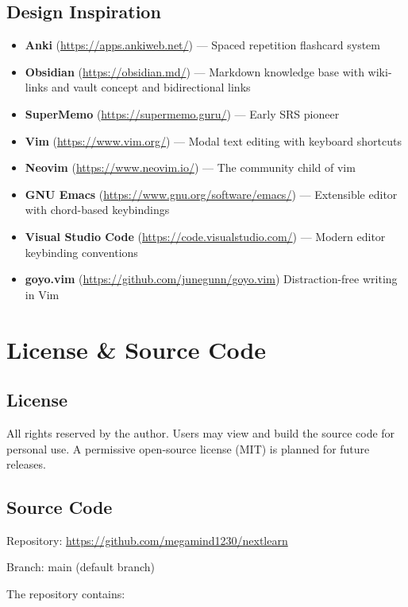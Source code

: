 \documentclass[14pt]{article}
\begin{document}
\subsection{Design Inspiration}
\label{sec:org291a351}
\begin{itemize}
\item \textbf{\textbf{Anki}} (\url{https://apps.ankiweb.net/}) — Spaced repetition flashcard
system
\item \textbf{\textbf{Obsidian}} (\url{https://obsidian.md/}) — Markdown knowledge base with
wiki-links and vault concept and bidirectional links
\item \textbf{\textbf{SuperMemo}} (\url{https://supermemo.guru/}) — Early SRS pioneer
\item \textbf{\textbf{Vim}} (\url{https://www.vim.org/}) — Modal text editing with keyboard
shortcuts
\item \textbf{\textbf{Neovim}} (\url{https://www.neovim.io/}) — The community child of vim
\item \textbf{\textbf{GNU Emacs}} (\url{https://www.gnu.org/software/emacs/}) — Extensible
editor with chord-based keybindings
\item \textbf{\textbf{Visual Studio Code}} (\url{https://code.visualstudio.com/}) — Modern
editor keybinding conventions
\item \textbf{\textbf{goyo.vim}} (\url{https://github.com/junegunn/goyo.vim}) Distraction-free writing in Vim
\end{itemize}

\newpage
\section{License \& Source Code}
\label{sec:orgbf45058}
\subsection{License}
\label{sec:org503b153}
All rights reserved by the author. Users may view and build the source
code for personal use. A permissive open-source license (MIT) is planned
for future releases.
\subsection{Source Code}
\label{sec:org99507a6}
Repository: \url{https://github.com/megamind1230/nextlearn}

Branch: main (default branch)

The repository contains:
\end{document}
